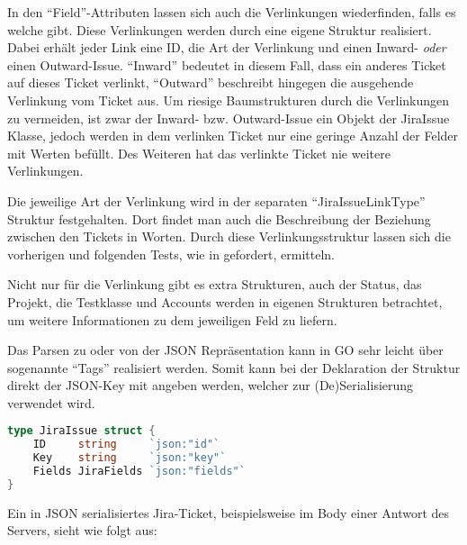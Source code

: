 In den ``Field''-Attributen lassen sich auch die Verlinkungen wiederfinden, falls 
es welche gibt. Diese Verlinkungen werden durch eine eigene Struktur realisiert.
Dabei erhält jeder Link eine ID, die Art der Verlinkung und einen Inward- \textit{oder}
einen Outward-Issue. ``Inward'' bedeutet in diesem Fall, dass ein anderes Ticket auf dieses
Ticket verlinkt, ``Outward'' beschreibt hingegen die ausgehende Verlinkung vom Ticket aus. 
Um riesige Baumstrukturen durch die Verlinkungen zu vermeiden, 
ist zwar der Inward- bzw. Outward-Issue ein Objekt der JiraIssue Klasse, jedoch 
werden in dem verlinken Ticket nur eine geringe Anzahl der Felder mit Werten befüllt.
Des Weiteren hat das verlinkte Ticket nie weitere Verlinkungen.

Die jeweilige Art der Verlinkung wird in der separaten 
``JiraIssueLinkType'' Struktur festgehalten. Dort findet man auch die Beschreibung
der Beziehung zwischen den Tickets in Worten. Durch diese Verlinkungsstruktur
lassen sich die vorherigen und folgenden Tests, wie in 
gefordert, ermitteln.

Nicht nur für die Verlinkung gibt es extra Strukturen, auch der Status, das Projekt, 
die Testklasse und Accounts werden in eigenen Strukturen betrachtet, um weitere
Informationen zu dem jeweiligen Feld zu liefern.

Das Parsen zu oder von der \gls{JSON} Repräsentation kann in GO sehr leicht über
sogenannte ``Tags'' realisiert werden. Somit kann bei der Deklaration der Struktur
direkt der \gls{JSON}-Key mit angeben werden, welcher zur (De)Serialisierung verwendet wird.

\begin{lstlisting}[caption=Go Strukturdefinition mit JSON Tags,language=Go]
type JiraIssue struct {
    ID     string     `json:"id"`
    Key    string     `json:"key"`
    Fields JiraFields `json:"fields"`
}
\end{lstlisting}

Ein in \gls{JSON} serialisiertes Jira-Ticket, beispielsweise im Body einer Antwort
des Servers, sieht wie folgt aus:

